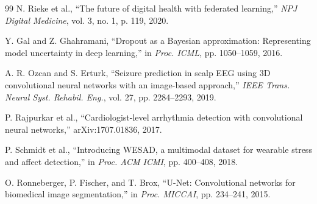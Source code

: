 \documentclass[journal]{IEEEtran}
\begin{document}
\begin{thebibliography}{99}
N. Rieke et al.,
``The future of digital health with federated learning,''
\textit{NPJ Digital Medicine}, vol. 3, no. 1, p. 119, 2020.

Y. Gal and Z. Ghahramani,
``Dropout as a Bayesian approximation: Representing model uncertainty
in deep learning,''
in \textit{Proc. ICML}, pp. 1050--1059, 2016.

A. R. Ozcan and S. Erturk,
``Seizure prediction in scalp EEG using 3D convolutional neural networks
with an image-based approach,''
\textit{IEEE Trans. Neural Syst. Rehabil. Eng.}, vol. 27, pp. 2284--2293, 2019.

P. Rajpurkar et al.,
``Cardiologist-level arrhythmia detection with convolutional neural networks,''
arXiv:1707.01836, 2017.

P. Schmidt et al.,
``Introducing WESAD, a multimodal dataset for wearable stress and affect
detection,''
in \textit{Proc. ACM ICMI}, pp. 400--408, 2018.

O. Ronneberger, P. Fischer, and T. Brox,
``U-Net: Convolutional networks for biomedical image segmentation,''
in \textit{Proc. MICCAI}, pp. 234--241, 2015.

\end{thebibliography}
\end{document}
